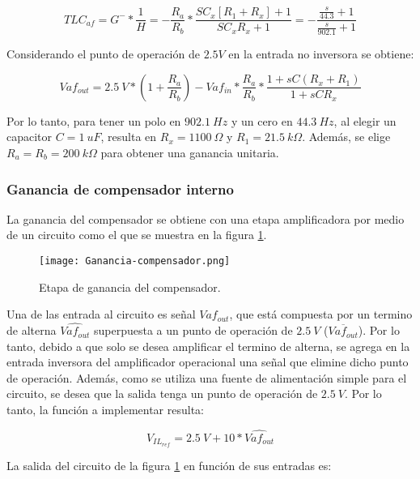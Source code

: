 \begin{equation} 
	TLC_{af} = G^- * \frac{1}{H}  =- \frac{R_a}{R_b} * \frac{SC_x[R_1+R_x]+1}{SC_xR_x+1}=-\frac{\frac{s}{44.3}+1}{\frac{s}{902.1}+1}
\end{equation}
 

Considerando el punto de operación de $2.5V$ en la entrada no inversora se obtiene:

\begin{equation} 
	Vaf_{out}= 2.5\:V* (1+\frac{R_a}{R_b})- Vaf_{in}*\frac{R_a}{R_b}*\frac{1+sC(R_x+R_1)}{1+sCR_x}
\end{equation}

Por lo tanto, para tener un polo en $902.1\:Hz$ y un cero en $44.3\:Hz$, al elegir un capacitor $C = 1\:uF$, resulta en $R_x = 1100\:\Omega$ y $R_1 = 21.5\:k\Omega$. Además, se elige $R_a = R_b = 200\:k\Omega$ para obtener una ganancia unitaria. 

\subsubsection{Ganancia de compensador interno}

La ganancia del compensador se obtiene con una etapa amplificadora por medio de un circuito como el que se muestra en la figura \ref{fig:ganancia-compensador}.

\begin{figure}[H]
	\centering
	\texttt{[image: Ganancia-compensador.png]}
	\caption{Etapa de ganancia del compensador.}
	\label{fig:ganancia-compensador}
\end{figure}

Una de las entrada al circuito es señal $Vaf_{out}$, que está compuesta por un termino de alterna $\hat{Vaf_{out}}$ superpuesta a un punto de operación de $2.5\:V$ ($\overline{Vaf_{out}}$). Por lo tanto, debido a que solo se desea amplificar el termino de alterna, se agrega en la entrada inversora del amplificador operacional una señal que elimine dicho punto de operación. Además, como se utiliza una fuente de alimentación simple para el circuito, se desea que la salida tenga un punto de operación de $2.5\:V$. Por lo tanto, la función a implementar resulta:

\begin{equation} \label{eq_sum_int_1}
	V_{IL_{ref}}=2.5\:V+10*\hat{Vaf_{out}}
\end{equation}

La salida del circuito de la figura \ref{fig:ganancia-compensador} en función de sus entradas es:


